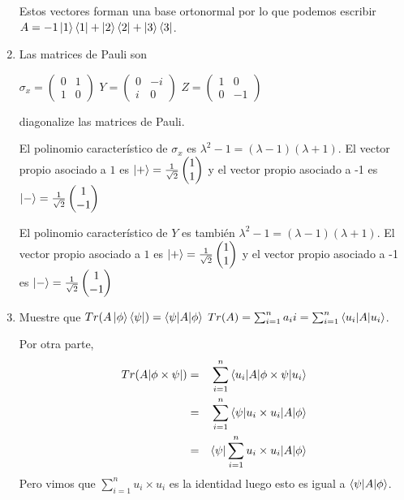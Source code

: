 \documentclass[letter,twoside,12pt]{article}
\begin{document}
\begin{enumerate}
Estos vectores forman una base ortonormal por lo que podemos escribir $ A = -1\ket{1}\bra{1}+\ket{2}\bra{2}+\ket{3}\bra{3}$.

\item Las matrices de Pauli son

$ \sigma_x = \begin{pmatrix}
0 & 1
\\1 & 0
\end{pmatrix}$ 
$ Y = \begin{pmatrix}
0 & -i
\\i & 0
\end{pmatrix}$ 
$ Z = \begin{pmatrix}
1 & 0
\\0 & -1
\end{pmatrix}$

diagonalize las matrices de Pauli.

El polinomio característico de $ \sigma_x $ es $ \lambda^2-1 = (\lambda-1)(\lambda+1)$. El vector propio asociado a $ 1 $ es $ \ket{+}= \frac{1}{\sqrt{2}}\begin{pmatrix}
1 \\ 1
\end{pmatrix} $ y el vector propio asociado a -1 es $ \ket{-}= \frac{1}{\sqrt{2}}\begin{pmatrix}
1 \\ -1
\end{pmatrix}$ 

El polinomio característico de $ Y $ es también $ \lambda^2-1 = (\lambda-1)(\lambda+1)$. El vector propio asociado a $ 1 $ es $ \ket{+}= \frac{1}{\sqrt{2}}\begin{pmatrix}
1 \\ 1
\end{pmatrix} $ y el vector propio asociado a -1 es $ \ket{-}= \frac{1}{\sqrt{2}}\begin{pmatrix}
1 \\ -1
\end{pmatrix}$ 

\item Muestre que $ Tr(A \ket{\phi}\bra{\psi})= \braket{\psi|A|\phi} $
$ Tr(A)= \sum_{i=1}^n a_ii = \sum_{i=1}^n \braket{u_i|A|u_i} $.

Por otra parte, 
\begin{eqnarray}
Tr(A|\phi \times \psi|) &=& \sum_{i=1}^n \braket{u_i|A|\phi \times \psi | u_i} \nonumber
\\ &=& \sum_{i=1}^n \braket{ \psi | u_i \times u_i|A|\phi} \nonumber
\\ &=& \braket{ \psi | \sum_{i=1}^n u_i \times u_i|A|\phi} \nonumber
\end{eqnarray}
Pero vimos que $ \sum_{i=1}^n u_i \times u_i$ es la identidad luego esto es igual a $ \braket{\psi|A|\phi} $.


\end{enumerate}
\end{document}
